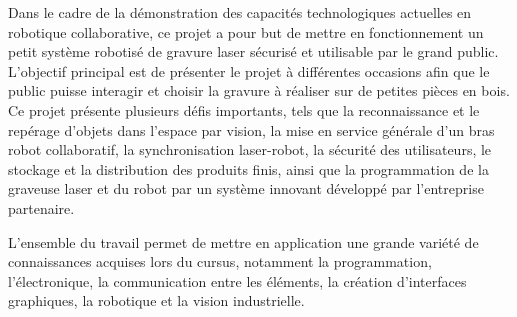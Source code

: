 
Dans le cadre de la démonstration des capacités technologiques actuelles en robotique collaborative, 
ce projet a pour but de mettre en fonctionnement un petit système robotisé de gravure laser sécurisé 
et utilisable par le grand public. L'objectif principal est de présenter le projet à différentes occasions 
afin que le public puisse interagir et choisir la gravure à réaliser sur de petites pièces en bois. Ce projet 
présente plusieurs défis importants, tels que la reconnaissance et le repérage d'objets dans l'espace
par vision, la mise en service générale d'un bras robot collaboratif, la synchronisation laser-robot, 
la sécurité des utilisateurs, le stockage et la distribution des produits finis, ainsi que la programmation
de la graveuse laser et du robot par un système innovant développé par l'entreprise partenaire.

L'ensemble du travail permet de mettre en application une grande variété de connaissances acquises lors
du cursus, notamment la programmation, l’électronique, la communication entre les éléments, la création
d'interfaces graphiques, la robotique et la vision industrielle.




